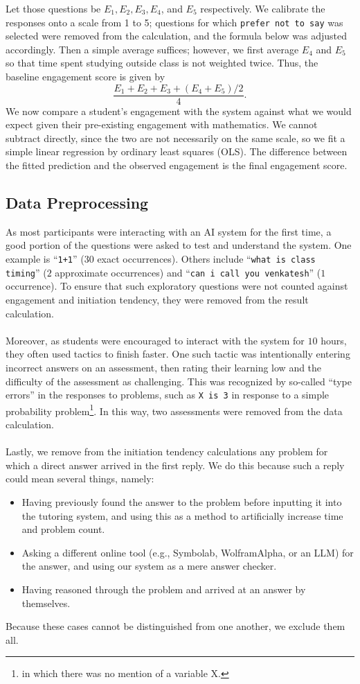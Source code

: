 \documentclass[12pt]{article}
\begin{document}
Let those questions be $E_1, E_2, E_3, E_4$, and $E_5$ respectively. We calibrate the responses onto a scale from 1 to 5; questions for which \texttt{prefer not to say} was selected were removed from the calculation, and the formula below was adjusted accordingly. Then a simple average suffices; however, we first average $E_4$ and $E_5$ so that time spent studying outside class is not weighted twice. Thus, the baseline engagement score is given by
\[\frac{E_1+E_2+E_3+(E_4+E_5)/2}{4}.\]
We now compare a student's engagement with the system against what we would expect given their pre-existing engagement with mathematics. We cannot subtract directly, since the two are not necessarily on the same scale, so we fit a simple linear regression by ordinary least squares (OLS). The difference between the fitted prediction and the observed engagement is the final engagement score.

\subsection{Data Preprocessing}

As most participants were interacting with an AI system for the first time, a good portion of the questions were asked to test and understand the system. One example is ``\texttt{1+1}'' ($30$ exact occurrences). Others include ``\texttt{what is class timing}'' ($2$ approximate occurrences) and ``\texttt{can i call you venkatesh}'' ($1$ occurrence). To ensure that such exploratory questions were not counted against engagement and initiation tendency, they were removed from the result calculation.
\\\\
Moreover, as students were encouraged to interact with the system for $10$ hours, they often used tactics to finish faster. One such tactic was intentionally entering incorrect answers on an assessment, then rating their learning low and the difficulty of the assessment as challenging. This was recognized by so-called ``type errors'' in the responses to problems, such as \texttt{X is 3} in response to a simple probability problem\footnote{in which there was no mention of a variable X.}. In this way, two assessments were removed from the data calculation.
\\\\
Lastly, we remove from the initiation tendency calculations any problem for which a direct answer arrived in the first reply. We do this because such a reply could mean several things, namely:
\begin{itemize}
    \item Having previously found the answer to the problem before inputting it into the tutoring system, and using this as a method to artificially increase time and problem count.
    \item Asking a different online tool (e.g., Symbolab, WolframAlpha, or an LLM) for the answer, and using our system as a mere answer checker.
    \item Having reasoned through the problem and arrived at an answer by themselves.
\end{itemize}
Because these cases cannot be distinguished from one another, we exclude them all.
\end{document}
